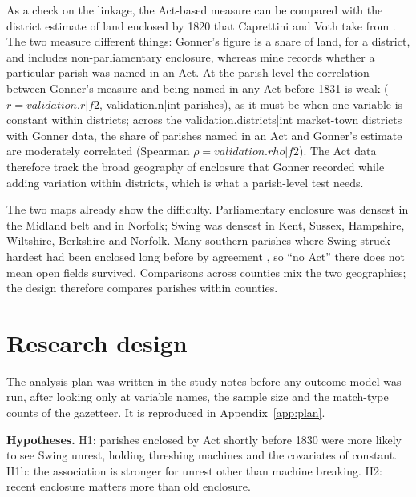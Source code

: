 \documentclass[11pt,a4paper]{article}
\begin{document}
As a check on the linkage, the Act-based measure can be compared with the district estimate of land enclosed by 1820 that Caprettini and Voth take from \citet{gonner1912}. The two measure different things: Gonner's figure is a share of land, for a district, and includes non-parliamentary enclosure, whereas mine records whether a particular parish was named in an Act. At the parish level the correlation between Gonner's measure and being named in any Act before 1831 is weak ($r={{validation.r|f2}}$, {{validation.n|int}} parishes), as it must be when one variable is constant within districts; across the {{validation.districts|int}} market-town districts with Gonner data, the share of parishes named in an Act and Gonner's estimate are moderately correlated (Spearman $\rho={{validation.rho|f2}}$). The Act data therefore track the broad geography of enclosure that Gonner recorded while adding variation within districts, which is what a parish-level test needs.

The two maps already show the difficulty. Parliamentary enclosure was densest in the Midland belt and in Norfolk; Swing was densest in Kent, Sussex, Hampshire, Wiltshire, Berkshire and Norfolk. Many southern parishes where Swing struck hardest had been enclosed long before by agreement \citep{wordie1983}, so ``no Act'' there does not mean open fields survived. Comparisons across counties mix the two geographies; the design therefore compares parishes within counties.

\section{Research design}
The analysis plan was written in the study notes before any outcome model was run, after looking only at variable names, the sample size and the match-type counts of the gazetteer. It is reproduced in Appendix~\ref{app:plan}.

\textbf{Hypotheses.} H1: parishes enclosed by Act shortly before 1830 were more likely to see Swing unrest, holding threshing machines and the covariates of \citet{caprettinivoth2020} constant. H1b: the association is stronger for unrest other than machine breaking. H2: recent enclosure matters more than old enclosure.
\end{document}
